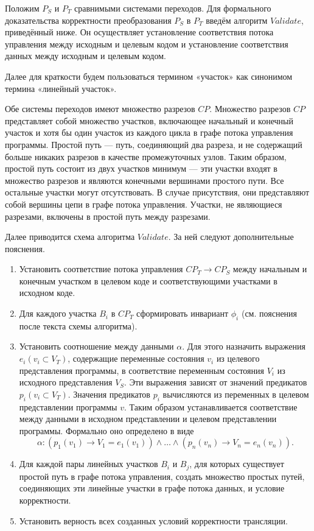 Положим $P_{S}$ и $P_{T}$ сравнимыми системами переходов. Для формального доказательства корректности преобразования $P_{S}$ в $P_{T}$ введём алгоритм $Validate$, приведённый ниже. Он осуществляет установление соответствия потока управления между исходным и целевым кодом и установление соответствия данных между исходным и целевым кодом.

Далее для краткости будем пользоваться термином «участок» как синонимом термина «линейный участок».

Обе системы переходов имеют множество разрезов $CP$. Множество разрезов $CP$ представляет собой множество участков, включающее начальный и конечный участок и хотя бы один участок из каждого цикла в графе потока управления программы. Простой путь --- путь, соединяющий два разреза, и не содержащий больше никаких разрезов в качестве промежуточных узлов. Таким образом, простой путь состоит из двух участков минимум --- эти участки входят в множество разрезов и являются конечными вершинами простого пути. Все остальные участки могут отсутствовать. В случае присутствия, они представляют собой вершины цепи в графе потока управления. Участки, не являющиеся разрезами, включены в простой путь между разрезами.

Далее приводится схема алгоритма $Validate$. За ней следуют дополнительные пояснения.

\begin{enumerate}
    \item Установить соответствие потока управления $CP_{T} \rightarrow CP_{S}$ между начальным и конечным участком в целевом коде и соответствующими участками в исходном коде.
    \item Для каждого участка $B_{i}$ в $CP_{T}$ сформировать инвариант $\phi_{i}$ (см. пояснения после текста схемы алгоритма). \label{st:invariant}
    \item Установить соотношение между данными $\alpha$. Для этого назначить выражения $e_i(v_i \subset V_T)$, содержащие переменные состояния $v_i$ из целевого представления программы, в соответствие переменным состояния $V_i$ из исходного представления $V_S$. Эти выражения зависят от значений предикатов $p_i(v_i \subset V_T)$. Значения предикатов $p_i$ вычисляются из переменных в целевом представлении программы $v$. Таким образом устанавливается соответствие между данными в исходном представлении и целевом представлении программы. Формально оно определено в виде
    \begin{equation*}
        \alpha : (p_1(v_1) \rightarrow V_1 = e_1(v_1)) \wedge \ldots \wedge (p_n(v_n) \rightarrow V_n = e_n(v_n)).
    \end{equation*}
    \item Для каждой пары линейных участков $B_{i}$ и $B_{j}$, для которых существует простой путь в графе потока управления, создать множество простых путей, соединяющих эти линейные участки в графе потока данных, и условие корректности.
    \item Установить верность всех созданных условий корректности трансляции.
\end{enumerate}

